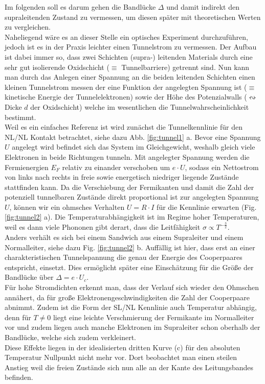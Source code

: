 \documentclass[twoside,        %
               BCOR12mm,       %
               english,ngerman, %
               fleqn,headsepline=false,footsepline=false
              ]{MFPREPORT}
\begin{document}
Im folgenden soll es darum gehen die Bandlücke $\Delta$ und damit indirekt den supraleitenden Zustand zu vermessen, um diesen später mit theoretischen Werten zu vergleichen.
\\
Naheliegend wäre es an dieser Stelle ein optisches Experiment durchzuführen, jedoch ist es in der Praxis leichter einen Tunnelstrom zu vermessen.
Der Aufbau ist dabei immer so, dass zwei Schichten (supra-) leitenden Materials durch eine sehr gut isolierende Oxidschicht ($\equiv $ Tunnelbarriere) getrennt sind. 
Nun kann man durch das Anlegen einer Spannung an die beiden leitenden Schichten einen kleinen Tunnelstrom messen der eine Funktion der angelegten Spannung ist ($\equiv$ kinetische Energie der Tunnelelektronen) sowie der Höhe des Potenzialwalls ($\leftrightsquigarrow$ Dicke $d$ der Oxidschicht) welche im wesentlichen die Tunnelwahrscheinlichkeit bestimmt.
\\
Weil es ein einfaches Referenz ist wird zunächst die Tunnelkennlinie für den NL/NL Kontakt betrachtet, siehe dazu Abb. \ref{fig:tunnel1} a.
Bevor eine Spannung $U$ angelegt wird befindet sich das System im Gleichgewicht, weshalb gleich viele Elektronen in beide Richtungen tunneln.
Mit angelegter Spannung werden die Fermienergien $E_F$ relativ zu einander verschoben um $e \cdot U$, sodass ein Nettostrom von links nach rechts in freie sowie energetisch niedriger liegende Zustände stattfinden kann. 
Da die Verschiebung der Fermikanten und damit die Zahl der potenziell tunnelbaren Zustände direkt proportional ist zur angelegten Spannung $U$, können wir ein ohmsches Verhalten $U= R \cdot I$ für die Kennlinie erwarten (Fig. \ref{fig:tunnel2} a).
Die Temperaturabhängigkeit ist im Regime hoher Temperaturen, weil es dann viele Phononen gibt derart, dass die Leitfähigkeit $\sigma \propto T^{-\frac{3}{2}}$.
\\
Anders verhält es sich bei einem Sandwich aus einem Supraleiter und einem Normalleiter, siehe dazu Fig. \ref{fig:tunnel2} b.
Auffällig ist hier, dass erst an einer charakteristischen Tunnelspannung die genau der Energie des Cooperpaares entspricht, einsetzt. Dies ermöglicht später eine Einschätzung für die Größe der Bandlücke  über $\Delta= e \cdot U_c$. 
\\
Für hohe Stromdichten erkennt man, dass der Verlauf sich wieder den Ohmschen annähert, da für große Elektronengeschwindigkeiten  die Zahl der Cooperpaare abnimmt. Zudem ist die Form der SL/NL Kennlinie auch Temperatur abhängig, denn für $T  \neq 0$ liegt eine leichte Verschmierung der Fermikante im Normalleiter vor und zudem liegen auch manche Elektronen im Supraleiter schon oberhalb der Bandlücke, welche sich zudem verkleinert.
\\
Diese Effekte liegen in der idealisierten dritten Kurve (c) für den absoluten Temperatur Nullpunkt nicht mehr vor.
Dort beobachtet man einen steilen Anstieg weil die freien Zustände sich nun alle an der Kante des Leitungsbandes befinden. 
\end{document}
